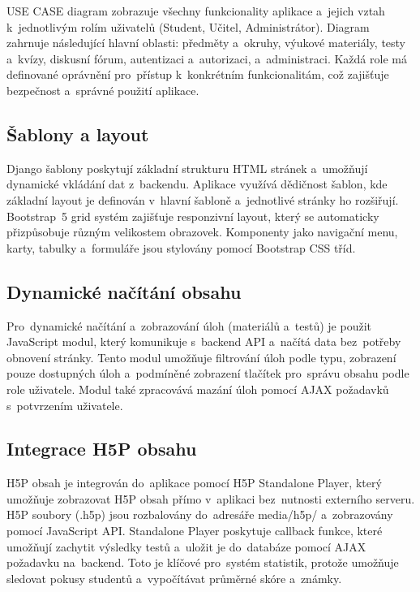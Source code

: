 \documentclass[12pt, a4paper,
twoside,
openany
]{report}
\begin{document}
	USE CASE diagram zobrazuje všechny funkcionality aplikace a~jejich vztah k~jednotlivým rolím uživatelů (Student, Učitel, Administrátor). Diagram zahrnuje následující hlavní oblasti: předměty a~okruhy, výukové materiály, testy a~kvízy, diskusní fórum, autentizaci a~autorizaci, a~administraci. Každá role má definované oprávnění pro~přístup k~konkrétním funkcionalitám, což zajišťuje bezpečnost a~správné použití aplikace.

	\subsection{Šablony a layout}
	
	Django šablony poskytují základní strukturu HTML stránek a~umožňují dynamické vkládání dat z~backendu. Aplikace využívá dědičnost šablon, kde základní layout je definován v~hlavní šabloně a~jednotlivé stránky ho rozšiřují. Bootstrap~5 grid systém zajišťuje responzivní layout, který se automaticky přizpůsobuje různým velikostem obrazovek. Komponenty jako navigační menu, karty, tabulky a~formuláře jsou stylovány pomocí Bootstrap CSS tříd.

	\subsection{Dynamické načítání obsahu}
	
	Pro~dynamické načítání a~zobrazování úloh (materiálů a~testů) je použit JavaScript modul, který komunikuje s~backend API a~načítá data bez~potřeby obnovení stránky. Tento modul umožňuje filtrování úloh podle typu, zobrazení pouze dostupných úloh a~podmíněné zobrazení tlačítek pro~správu obsahu podle role uživatele. Modul také zpracovává mazání úloh pomocí AJAX požadavků s~potvrzením uživatele.

	\subsection{Integrace H5P obsahu}
	
	H5P obsah je integrován do~aplikace pomocí H5P Standalone Player, který umožňuje zobrazovat H5P obsah přímo v~aplikaci bez~nutnosti externího serveru. H5P soubory (.h5p) jsou rozbalovány do~adresáře media/h5p/ a~zobrazovány pomocí JavaScript API. Standalone Player poskytuje callback funkce, které umožňují zachytit výsledky testů a~uložit je do~databáze pomocí AJAX požadavku na~backend. Toto je klíčové pro~systém statistik, protože umožňuje sledovat pokusy studentů a~vypočítávat průměrné skóre a~známky.
	
\end{document}
